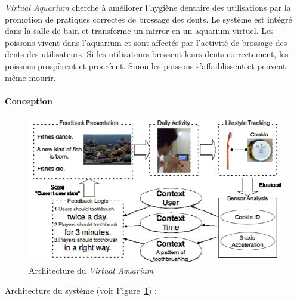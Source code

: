 \documentclass[10pt,a5paper,twoside]{article}
\begin{document}
\emph{Virtual Aquarium} cherche à améliorer l'hygiène dentaire des
utilisations par la promotion de pratiques correctes de brossage des
dents. Le système est intégré dans la salle de bain et transforme un
mirror en un aquarium virtuel. Les poissons vivent dans l'aquarium et
sont affectés par l'activité de brossage des dents des utilisateurs. Si
les utilisateurs brossent leurs dents correctement, les poissons
prospèrent et procréent. Sinon les poissons s'affaiblissent et peuvent
même mourir.

\paragraph{Conception}\label{conception}

\begin{figure}
\centering
\includegraphics[]{images/virtualaquarium-screenshot2.png}
\caption{Architecture du \emph{Virtual
Aquarium}}\label{fig:virtualaquarium1}
\end{figure}

Architecture du système (voir Figure~\ref{fig:virtualaquarium1}) :
\end{document}
